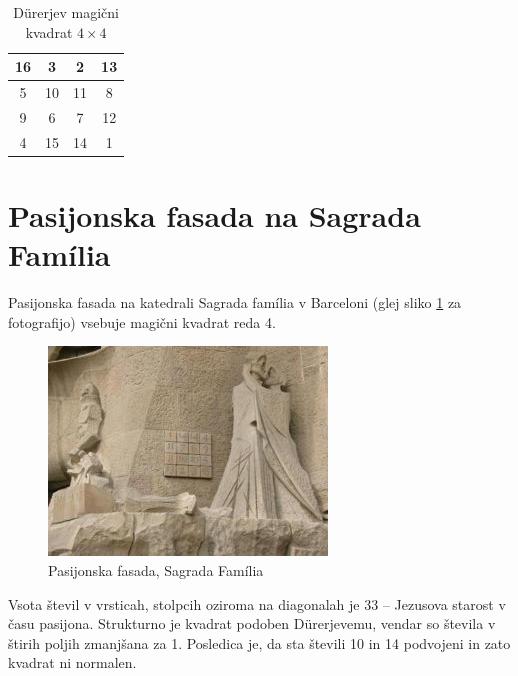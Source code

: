 \documentclass[a4paper,12pt]{article}
\begin{document}
\begin{table}[h]
\centering
\caption{Dürerjev magični kvadrat $4 \times 4$}  %
\label{table:durer}  %
\begin{tabular}{|c|c|c|c|}
\hline
16 &  3 &  2 & 13 \\\hline
 5 & 10 & 11 &  8 \\\hline
 9 &  6 &  7 & 12 \\\hline
 4 & 15 & 14 &  1 \\\hline
\end{tabular}
\end{table}

\section{Pasijonska fasada na Sagrada Família}
Pasijonska fasada na katedrali Sagrada família v Barceloni
(glej sliko \ref{fig:sagrada} za fotografijo) vsebuje magični kvadrat reda 4.

\begin{figure}[h]
   \centering
   \includegraphics[scale=1.3]{sagrada.png}  %
   \caption{Pasijonska fasada, Sagrada Família}  %
   \label{fig:sagrada}  %
   \end{figure}


Vsota števil v vrsticah, stolpcih oziroma na diagonalah je 33 -- Jezusova starost
v času pasijona. Strukturno je kvadrat podoben Dürerjevemu, vendar so števila
v štirih poljih zmanjšana za 1. Posledica je, da sta števili 10 in 14 podvojeni
in zato kvadrat ni normalen.
%
\end{document}
